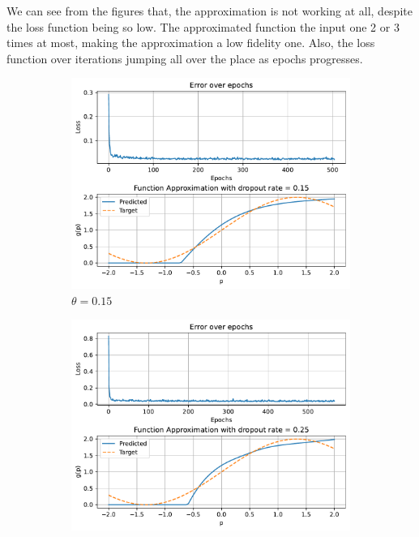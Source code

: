 We can see from the figures that, the approximation is not working at all, despite the loss function being so low. The approximated function  the input one 2 or 3 times at most, making the approximation a low fidelity one.
Also, the loss function over iterations jumping all over the place as epochs progresses.

\begin{figure}[htpb]
	\centering
	\begin{subfigure}{0.47\textwidth}
		\centering
		\includegraphics[width=\textwidth]{../Problem 5/nn_1_12_1_0.15.pdf}
		\caption{$\theta=0.15$}
	\end{subfigure}
	\hfill
	\begin{subfigure}{0.47\textwidth}
		\centering
		\includegraphics[width=\textwidth]{../Problem 5/nn_1_12_1_0.25.pdf}

\end{subfigure}
\end{figure}
